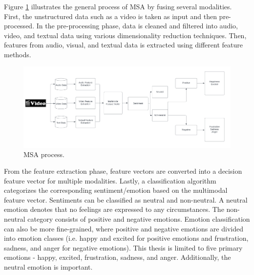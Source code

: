 Figure \ref{fig:msa_process} illustrates the general process of MSA by fusing several modalities. First, the unstructured data such as a video is taken as input and then pre-processed. In the pre-processing phase, data is cleaned and filtered into audio, video, and textual data using various dimensionality reduction techniques. Then, features from audio, visual, and textual data is extracted using different feature methods.  
%
\begin{figure}[h]
  \centering
  \includegraphics[width=\textwidth]{figures/msa_process_dpi.png}
  \caption{MSA process.}
  \label{fig:msa_process}
\end{figure}
%
From the feature extraction phase, feature vectors are converted into a decision feature vector for multiple modalities. Lastly, a classification algorithm categorizes the corresponding sentiment/emotion based on the multimodal feature vector. Sentiments can be classified as neutral and non-neutral. A neutral emotion denotes that no feelings are expressed to any circumstances. The non-neutral category consists of positive and negative emotions. Emotion classification can also be more fine-grained, where positive and negative emotions are divided into emotion classes (i.e. happy and excited for positive emotions and frustration, sadness, and anger for negative emotions). This thesis is limited to five primary emotions - happy, excited, frustration, sadness, and anger. Additionally, the neutral emotion is important. \\

